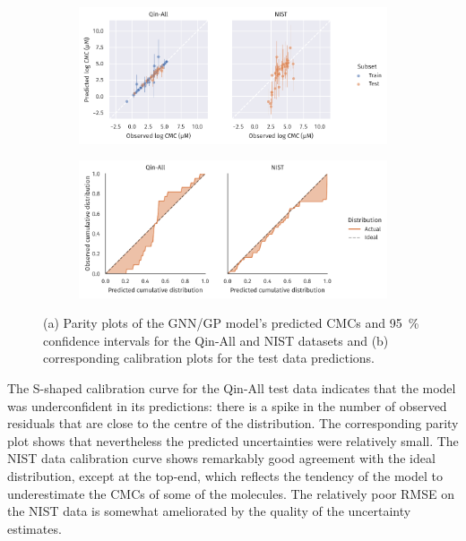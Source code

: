 \begin{figure}
    \centering
    \begin{subfigure}{\textwidth}
        \includegraphics[width=\textwidth]{images/uq-parity.pdf}
        \caption{}
        \label{fig:uq-parity}
    \end{subfigure}
    \begin{subfigure}{\textwidth}
        \includegraphics[width=\textwidth]{images/uq-calibration.pdf}
        \caption{}
        \label{fig:uq-calibration}
    \end{subfigure}
    \caption{(a) Parity plots of the GNN/GP model's predicted CMCs and \SI{95}{\%}
    confidence intervals for the Qin-All and NIST datasets and (b) corresponding
    calibration plots for the test data predictions.}
\end{figure}

The S-shaped calibration curve for the Qin-All test data indicates that the
model was underconfident in its predictions: there is a spike in the number of
observed residuals that are close to the centre of the distribution. The
corresponding parity plot shows that nevertheless the predicted uncertainties
were relatively small. The NIST data calibration curve shows remarkably good
agreement with the ideal distribution, except at the top-end, which reflects the
tendency of the model to underestimate the CMCs of some of the molecules. The
relatively poor RMSE on the NIST data is somewhat ameliorated by the quality of
the uncertainty estimates.

